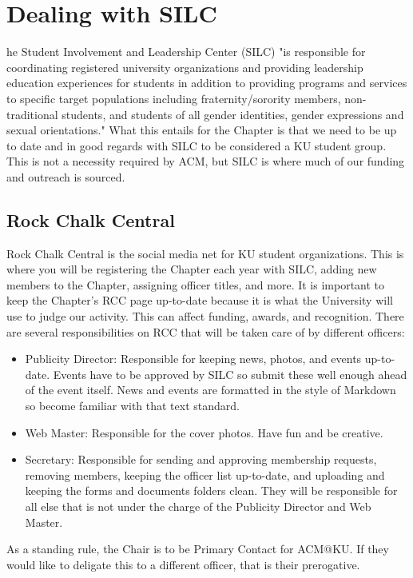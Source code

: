 %
%
\let\textcircled=\pgftextcircled
\chapter{Dealing with SILC}
\label{chap:silc}

he Student Involvement and Leadership Center (SILC) "is responsible for coordinating registered university organizations and providing leadership education experiences for students in addition to providing programs and services to specific target populations including fraternity/sorority members, non-traditional students, and students of all gender identities, gender expressions and sexual orientations." What this entails for the Chapter is that we need to be up to date and in good regards with SILC to be considered a KU student group. This is not a necessity required by ACM, but SILC is where much of our funding and outreach is sourced.


\section{Rock Chalk Central}
\label{sec:sec01}

Rock Chalk Central is the social media net for KU student organizations. This is where you will be registering the Chapter each year with SILC, adding new members to the Chapter, assigning officer titles, and more. It is important to keep the Chapter's RCC page up-to-date because it is what the University will use to judge our activity. This can affect funding, awards, and recognition.
There are several responsibilities on RCC that will be taken care of by different officers:
\begin{itemize}
	\item Publicity Director: Responsible for keeping news, photos, and events up-to-date. Events have to be approved by SILC so submit these well enough ahead of the event itself. News and events are formatted in the style of Markdown so become familiar with that text standard.
	\item Web Master: Responsible for the cover photos. Have fun and be creative.
	\item Secretary: Responsible for sending and approving membership requests, removing members, keeping the officer list up-to-date, and uploading and keeping the forms and documents folders clean. They will be responsible for all else that is not under the charge of the Publicity Director and Web Master.
\end{itemize}
As a standing rule, the Chair is to be Primary Contact for ACM@KU. If they would like to deligate this to a different officer, that is their prerogative.

